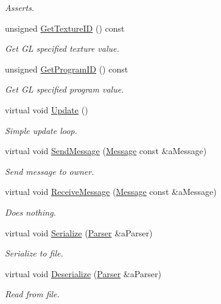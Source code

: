 \begin{DoxyCompactItemize}
\begin{DoxyCompactList}\small\item\em Asserts. \end{DoxyCompactList}\item 
unsigned \hyperlink{classPCSurface_a12a1c96a21cf6c1830ab7a5e64a24155}{Get\+Texture\+ID} () const 
\begin{DoxyCompactList}\small\item\em Get GL specified texture value. \end{DoxyCompactList}\item 
unsigned \hyperlink{classPCSurface_a24a0e4acd092742475a9556af8294da7}{Get\+Program\+ID} () const 
\begin{DoxyCompactList}\small\item\em Get GL specified program value. \end{DoxyCompactList}\item 
virtual void \hyperlink{classPCSurface_aa6fe355056fdba082057589d573f82a3}{Update} ()
\begin{DoxyCompactList}\small\item\em Simple update loop. \end{DoxyCompactList}\item 
virtual void \hyperlink{classPCSurface_a60d206d597fdfd577df4917d6544f127}{Send\+Message} (\hyperlink{classMessage}{Message} const \&a\+Message)
\begin{DoxyCompactList}\small\item\em Send message to owner. \end{DoxyCompactList}\item 
virtual void \hyperlink{classPCSurface_aad85a98841b47cc7bf4b46e72c0692db}{Receive\+Message} (\hyperlink{classMessage}{Message} const \&a\+Message)
\begin{DoxyCompactList}\small\item\em Does nothing. \end{DoxyCompactList}\item 
virtual void \hyperlink{classPCSurface_a441bbcebb3b8cdab0966856331733908}{Serialize} (\hyperlink{classParser}{Parser} \&a\+Parser)
\begin{DoxyCompactList}\small\item\em Serialize to file. \end{DoxyCompactList}\item 
virtual void \hyperlink{classPCSurface_a0406f2287a52aebb4da1b6ef0deddf8d}{Deserialize} (\hyperlink{classParser}{Parser} \&a\+Parser)
\begin{DoxyCompactList}\small\item\em Read from file. \end{DoxyCompactList}\end{DoxyCompactItemize}
